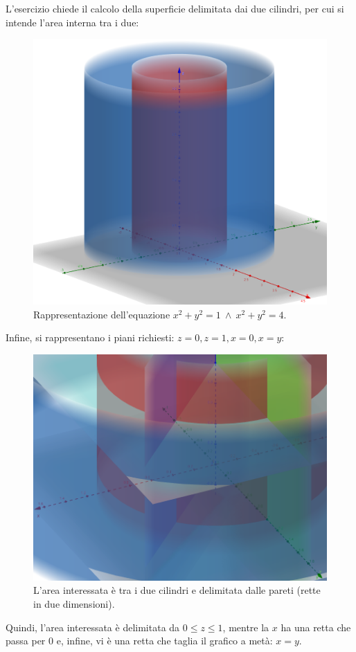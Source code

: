 \documentclass[a4paper]{article}
\begin{document}
	\noindent
	L'esercizio chiede il calcolo della superficie delimitata dai due cilindri, per cui si intende l'area interna tra i due:
	\begin{figure}[!htp]
		\centering
		\includegraphics[width=.7\textwidth]{img/integrali_tripli-coordinate_cilindriche_3.png}
		\caption{Rappresentazione dell'equazione $x^{2}+y^{2} = 1 \: \land \:x^{2}+y^{2} = 4$.}
	\end{figure}

	\noindent
	Infine, si rappresentano i piani richiesti: $z=0,z=1,x=0,x=y$:
	\begin{figure}[!htp]
		\centering
		\includegraphics[width=.7\textwidth]{img/integrali_tripli-coordinate_cilindriche_4.png}
		\caption{L'area interessata è tra i due cilindri e delimitata dalle pareti (rette in due dimensioni).}
	\end{figure}

	\noindent
	Quindi, l'area interessata è delimitata da $0 \le z \le 1$, mentre la $x$ ha una retta che passa per $0$ e, infine, vi è una retta che taglia il grafico a metà: $x = y$.\newpage
\end{document}
